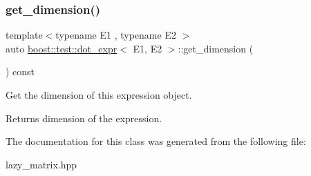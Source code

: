 \subsubsection{\texorpdfstring{get\_dimension()}{get\_dimension()}}
{\footnotesize\ttfamily template$<$typename E1 , typename E2 $>$ \\
auto \mbox{\hyperlink{classboost_1_1test_1_1dot__expr}{boost\+::test\+::dot\+\_\+expr}}$<$ E1, E2 $>$\+::get\+\_\+dimension (\begin{DoxyParamCaption}{ }\end{DoxyParamCaption}) const\hspace{0.3cm}{\ttfamily [inline]}}



Get the dimension of this expression object. 

\begin{DoxyReturn}{Returns}
dimension of the expression. 
\end{DoxyReturn}


The documentation for this class was generated from the following file\+:\begin{DoxyCompactItemize}
\item 
lazy\+\_\+matrix.\+hpp\end{DoxyCompactItemize}
